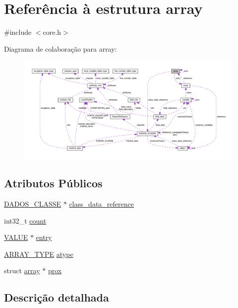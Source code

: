 \hypertarget{structarray}{\section{Referência à estrutura array}
\label{structarray}
}


{\ttfamily \#include $<$core.\-h$>$}



Diagrama de colaboração para array\-:\nopagebreak
\begin{figure}[H]
\begin{center}
\leavevmode
\includegraphics[width=350pt]{structarray__coll__graph}
\end{center}
\end{figure}
\subsection*{Atributos Públicos}
\begin{DoxyCompactItemize}
\item 
\hyperlink{struct_d_a_d_o_s___c_l_a_s_s_e}{D\-A\-D\-O\-S\-\_\-\-C\-L\-A\-S\-S\-E} $\ast$ \hyperlink{structarray_a48536838f6c8518606bb3ab53b8992c5}{class\-\_\-data\-\_\-reference}
\item 
int32\-\_\-t \hyperlink{structarray_ac87b36a4ba31b9d2a2bf77af4c136428}{count}
\item 
\hyperlink{core_8h_ad5d0e2bb91a9e28f920452e088b6462b}{V\-A\-L\-U\-E} $\ast$ \hyperlink{structarray_ae5d7e6555edc115b43c4595ab022023d}{entry}
\item 
\hyperlink{core_8h_aeeb4b41434914a6809f3448b40f818de}{A\-R\-R\-A\-Y\-\_\-\-T\-Y\-P\-E} \hyperlink{structarray_af7ebd5860861c4c445eea16d8385bee6}{atype}
\item 
struct \hyperlink{structarray}{array} $\ast$ \hyperlink{structarray_ac5278e82af38bcc76811769de4bd4400}{prox}
\end{DoxyCompactItemize}


\subsection{Descrição detalhada}


